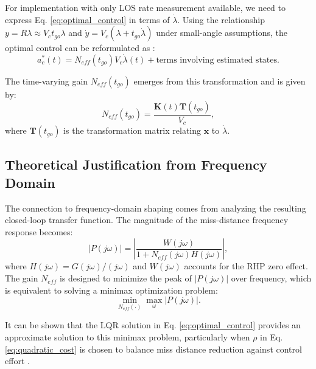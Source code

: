 \documentclass[11pt,a4paper]{article}
\begin{document}
For implementation with only LOS rate measurement available, we need to express Eq. \eqref{eq:optimal_control} in terms of $\dot{\lambda}$. Using the relationship $y = R\lambda \approx V_c t_{go} \lambda$ and $\dot{y} = V_c (\lambda + t_{go} \dot{\lambda})$ under small-angle assumptions, the optimal control can be reformulated as \cite{Yanushevsky2007}:
\begin{equation}
a_c^*(t) = N_{eff}(t_{go}) V_c \dot{\lambda}(t) + \text{terms involving estimated states}.
\label{eq:reformulated_control}
\end{equation}

The time-varying gain $N_{eff}(t_{go})$ emerges from this transformation and is given by:
\begin{equation}
N_{eff}(t_{go}) = \frac{\mathbf{K}(t) \mathbf{T}(t_{go})}{V_c},
\label{eq:Neff_definition}
\end{equation}
where $\mathbf{T}(t_{go})$ is the transformation matrix relating $\mathbf{x}$ to $\dot{\lambda}$.

\subsection{Theoretical Justification from Frequency Domain}
The connection to frequency-domain shaping comes from analyzing the resulting closed-loop transfer function. The magnitude of the miss-distance frequency response becomes:
\begin{equation}
|P(j\omega)| = \left| \frac{W(j\omega)}{1 + N_{eff}(j\omega) H(j\omega)} \right|,
\label{eq:closed_loop_P}
\end{equation}
where $H(j\omega) = G(j\omega)/(j\omega)$ and $W(j\omega)$ accounts for the RHP zero effect. The gain $N_{eff}$ is designed to minimize the peak of $|P(j\omega)|$ over frequency, which is equivalent to solving a minimax optimization problem:
\begin{equation}
\min_{N_{eff}(\cdot)} \max_{\omega} |P(j\omega)|.
\label{eq:minimax_problem}
\end{equation}

It can be shown that the LQR solution in Eq. \eqref{eq:optimal_control} provides an approximate solution to this minimax problem, particularly when $\rho$ in Eq. \eqref{eq:quadratic_cost} is chosen to balance miss distance reduction against control effort \cite{Yanushevsky2007, Zarchan2002}.
\end{document}
